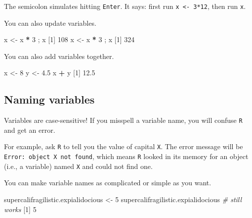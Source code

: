 \documentclass[
]{book}
\newenvironment{Shaded}{\begin{snugshade}}{\end{snugshade}}
\newcommand{\CommentTok}[1]{\textcolor[rgb]{0.56,0.35,0.01}{\textit{#1}}}
\newcommand{\DecValTok}[1]{\textcolor[rgb]{0.00,0.00,0.81}{#1}}
\newcommand{\FloatTok}[1]{\textcolor[rgb]{0.00,0.00,0.81}{#1}}
\newcommand{\NormalTok}[1]{#1}
\newcommand{\OperatorTok}[1]{\textcolor[rgb]{0.81,0.36,0.00}{\textbf{#1}}}
\newcommand{\StringTok}[1]{\textcolor[rgb]{0.31,0.60,0.02}{#1}}
\begin{document}
The semicolon simulates hitting \texttt{Enter}. It says: first run \texttt{x\ \textless{}-\ 3*12}, then run \texttt{x}.

You can also update variables.

\begin{Shaded}
\begin{Highlighting}[]
\NormalTok{x <-}\StringTok{ }\NormalTok{x }\OperatorTok{*}\StringTok{ }\DecValTok{3}\NormalTok{ ; x}
\NormalTok{[}\DecValTok{1}\NormalTok{] }\DecValTok{108}
\NormalTok{x <-}\StringTok{ }\NormalTok{x }\OperatorTok{*}\StringTok{ }\DecValTok{3}\NormalTok{ ; x}
\NormalTok{[}\DecValTok{1}\NormalTok{] }\DecValTok{324}
\end{Highlighting}
\end{Shaded}

You can also add variables together.

\begin{Shaded}
\begin{Highlighting}[]
\NormalTok{x <-}\StringTok{ }\DecValTok{8}
\NormalTok{y <-}\StringTok{ }\FloatTok{4.5}
\NormalTok{x }\OperatorTok{+}\StringTok{ }\NormalTok{y}
\NormalTok{[}\DecValTok{1}\NormalTok{] }\FloatTok{12.5}
\end{Highlighting}
\end{Shaded}

\hypertarget{naming-variables}{%
\subsection*{Naming variables}\label{naming-variables}}

Variables are case-sensitive! If you misspell a variable name, you will confuse \texttt{R} and get an error.

For example, ask \texttt{R} to tell you the value of capital \texttt{X}. The error message will be \texttt{Error:\ object\ \textquotesingle{}X\textquotesingle{}\ not\ found}, which means \texttt{R} looked in its memory for an object (i.e., a variable) named \texttt{X} and could not find one.

You can make variable names as complicated or simple as you want.

\begin{Shaded}
\begin{Highlighting}[]
\NormalTok{supercalifragilistic.expialidocious <-}\StringTok{ }\DecValTok{5}
\NormalTok{supercalifragilistic.expialidocious  }\CommentTok{# still works}
\NormalTok{[}\DecValTok{1}\NormalTok{] }\DecValTok{5}
\end{Highlighting}
\end{Shaded}
\end{document}
